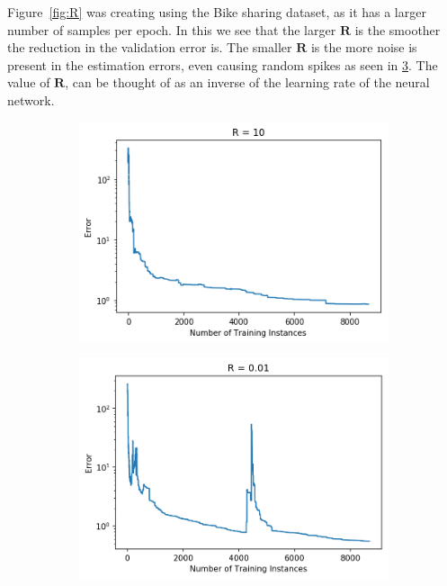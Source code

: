 \documentclass{article}
\begin{document}
Figure~\ref{fig:R} was creating using the Bike sharing dataset, as it has a larger number of samples per epoch. In this we see that the larger $\boldsymbol{R}$ is the smoother the reduction in the validation error is. The smaller $\boldsymbol{R}$ is the more noise is present in the estimation errors, even causing random spikes as seen in \ref{fig:R1e-2}. The value of $\boldsymbol{R}$, can be thought of as an inverse of the learning rate of the neural network. 
\begin{figure}[ht]
    \centering
    \begin{subfigure}[b]{0.45\linewidth}
        \includegraphics[width=\linewidth]{R_10.png}
        \caption{}
        \label{fig:R10}
    \end{subfigure}%
    \begin{subfigure}[b]{0.45\linewidth}
        \includegraphics[width=\textwidth]{R_001.png}
        \caption{}
        \label{fig:R1e-2}
    \end{subfigure}%
    

\end{figure}
\end{document}
